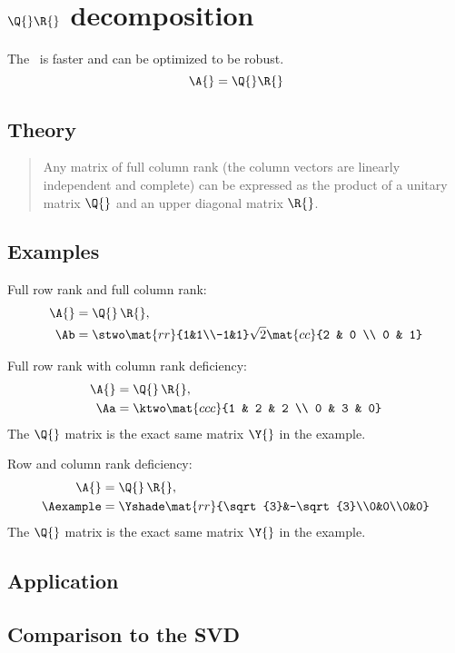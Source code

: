 \section[$\A{}=\Q{}\R{}$]{$\Q{}\R{}$ decomposition}

The \qr \ is faster and can be optimized to be robust.
\begin{equation}
  \A{}=\Q{}\R{}
\end{equation}

\subsection{Theory}
\begin{quote}
 Any matrix of full column rank (the column vectors are linearly independent and complete) can be expressed as the product of a unitary matrix $\Q{}$ and an upper diagonal matrix $\R{}$.
\end{quote}

\subsection{Examples}
Full row rank and full column rank:
\begin{equation}
  \begin{split}
    \A{} & = \Q{}\,\R{},\\
    \Ab & =
    \stwo   \mat{rr}{1&1\\-1&1}
    \sqrt{2}\mat{cc}{2 & 0 \\ 0 & 1}
  \end{split}
\end{equation}

Full row rank with column rank deficiency:
\begin{equation}
  \begin{split}
    \A{} & = \Q{}\,\R{},\\
    \Aa & =
    \ktwo
    \mat{ccc}{1 & 2 & 2 \\ 0 & 3 & 0}
  \end{split}
\end{equation}
The $\Q{}$ matrix is the exact same matrix $\Y{}$ in the example.


Row and column rank deficiency:
\begin{equation}
  \begin{split}
    \A{} & = \Q{}\,\R{},\\
    \Aexample & =
    \Yshade
    \mat{rr}{\sqrt{3}&-\sqrt{3}\\0&0\\0&0}
  \end{split}
\end{equation}
The $\Q{}$ matrix is the exact same matrix $\Y{}$ in the example.


\subsection{Application}

\subsection{Comparison to the SVD}

\endinput